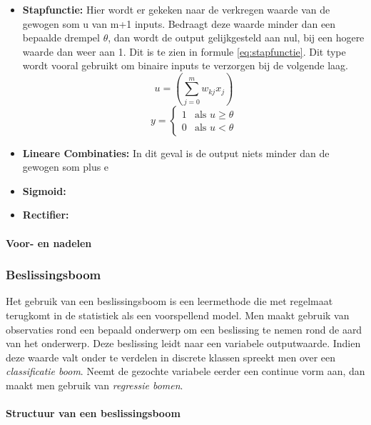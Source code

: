 			\begin{itemize}
				\item \textbf{Stapfunctie:} Hier wordt er gekeken naar de verkregen waarde van de gewogen som u van m+1 inputs. Bedraagt deze waarde minder dan een bepaalde drempel $\theta$, dan wordt de output gelijkgesteld aan nul, bij een hogere waarde dan weer aan 1. Dit is te zien in formule \ref{eq:stapfunctie}. Dit type wordt vooral gebruikt om binaire inputs te verzorgen bij de volgende laag. 
				\begin{equation}
				u =  \left( \sum_{j=0}^{m}w_{kj}x_j\right) 
				\end{equation}
				\begin{equation}\label{eq:stapfunctie}
				y={\begin{cases}1&{\text{als }}u\geq \theta
					\\0&{\text{als }}u<\theta \end{cases}}
				\end{equation}
				
				\item \textbf{Lineare Combinaties:} In dit geval is de output niets minder dan de gewogen som plus e
				\item \textbf{Sigmoid:}
				\item \textbf{Rectifier:}
			\end{itemize}
			
		\paragraph{Voor- en nadelen}
		
		
	\subsubsection{Beslissingsboom} 
	Het gebruik van een beslissingsboom is een leermethode die met regelmaat terugkomt in de statistiek als een voorspellend model. Men maakt gebruik van observaties rond een bepaald onderwerp om een beslissing te nemen rond de aard van het onderwerp. Deze beslissing leidt naar een variabele outputwaarde. Indien deze waarde valt onder te verdelen in discrete klassen spreekt men over een \textit{classificatie boom}. Neemt de gezochte variabele eerder een continue vorm aan, dan maakt men gebruik van \textit{regressie bomen}.
	

	
		\paragraph{Structuur van een beslissingsboom}
		
